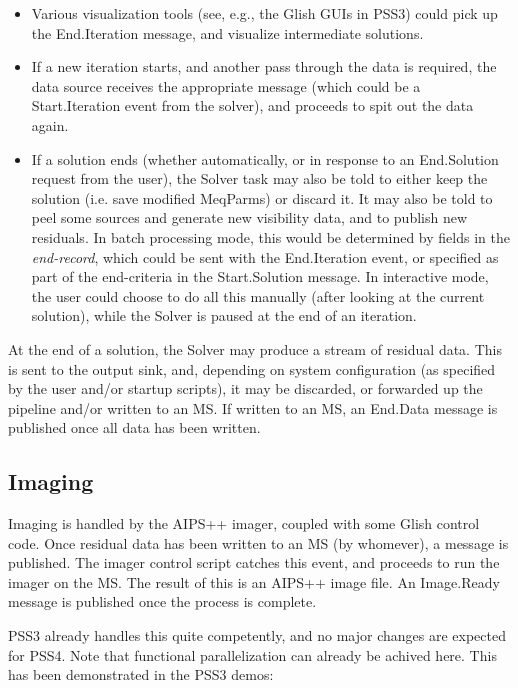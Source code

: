 \documentclass[12pt]{article}
\begin{document}
\begin{itemize}
  \item Various visualization tools (see, e.g., the Glish GUIs in PSS3) could
  pick up the End.Iteration message, and visualize intermediate solutions.

  \item If a new iteration starts, and another pass through the data is
  required, the data source receives the appropriate message (which could be a
  Start.Iteration event from the solver), and proceeds to spit out the data
  again. 

  \item If a solution ends (whether automatically, or in response to an
  End.Solution request from the user), the Solver task may also be told to
  either keep the solution (i.e. save modified MeqParms) or discard it. It may
  also be told to peel some sources and generate new visibility data, and to
  publish new residuals. In batch processing mode, this would be determined by
  fields in the {\em end-record}, which could be sent with the End.Iteration
  event, or specified as part of the end-criteria in the Start.Solution
  message. In interactive mode, the user could choose to do all this manually
  (after looking at the current solution), while the Solver is paused at the
  end of an iteration.

  \end{itemize}
  
  At the end of a solution, the Solver may produce a stream of residual data.
  This is sent to the output sink, and, depending on system configuration (as
  specified by the user and/or startup scripts), it may be discarded, or
  forwarded up the pipeline and/or written to an MS. If written to an MS, an
  End.Data message is published once all data has been written. 

\subsection{Imaging}

  Imaging is handled by the AIPS++ imager, coupled with some Glish control
  code. Once residual data has been written to an MS (by whomever), a message
  is published. The imager control script catches this event, and proceeds to
  run the imager on the MS. The result of this is an AIPS++ image file. An
  Image.Ready message is published once the process is complete.

  PSS3 already handles this quite competently, and no major changes are
  expected for PSS4. Note that functional parallelization can already be
  achived here. This has been demonstrated in the PSS3 demos:
  
\end{document}
